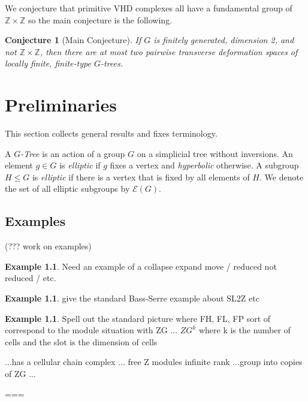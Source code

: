 \documentclass[12pt,parskip=full]{report}
\theoremstyle{plain}
\newtheorem{conj}[thm]{Conjecture}
\theoremstyle{definition}
\newtheorem{exa}[thm]{Example}
\begin{document}
% 

We conjecture that primitive VHD complexes all have a fundamental group of \(\mathbb{Z}\times \mathbb{Z}\) so the main conjecture is the following.

\begin{conj}
    [Main Conjecture]
    If \(G\) is finitely generated, dimension 2, and not \(\mathbb{Z}\times \mathbb{Z}\), then there are at most two pairwise transverse deformation spaces of locally finite, finite-type \(G\)-trees.
\end{conj}

\chapter{Preliminaries}

    This section collects general results and fixes terminology.

    A \emph{\(G\)-Tree} is an action of a group \(G\) on a simplicial tree without inversions. An element \(g\in G\) is \emph{elliptic} if \(g\) fixes a vertex and \emph{hyperbolic} otherwise. A subgroup \(H\leq G\) is \emph{elliptic} if there is a vertex that is fixed by all elements of \(H\). We denote the set of all elliptic subgroups by \(\mathcal{E}(G)\).

\section{Examples}

(??? work on examples)
\begin{exa}
Need an example of a collapse expand move / reduced not reduced / etc.
\end{exa}

\begin{exa}
give the standard Bass-Serre example about SL2Z etc
\end{exa}

\begin{exa}
Spell out the standard picture where FH, FL, FP sort of correspond to the module situation with ZG ... \(ZG^k\) where k is the number of cells and the slot is the dimension of cells

...has a cellular chain complex ... free Z modules infinite rank
...group into copies of ZG ...



===






\end{exa}
\end{document}
